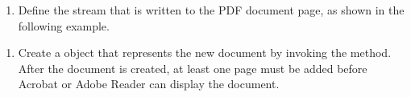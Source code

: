 \documentclass[letterpaper,12pt,english,openany,oneside]{sphinxmanual}
\begin{document}
\begin{sphinxVerbatim}[commandchars=\\\{\}]
 
     
     
     
     
\end{sphinxVerbatim}
\begin{enumerate}
%
\setcounter{enumi}{1}
\item {} 
Define the stream that is written to the PDF document page, as shown in the following example.

\end{enumerate}

\begin{sphinxVerbatim}[commandchars=\\\{\}]
   
     
\end{sphinxVerbatim}
\begin{enumerate}
%
\setcounter{enumi}{2}
\item {} 
Create a  object that represents the new document by invoking the  method. After the document is created, at least one page must be added before Acrobat or Adobe Reader can display the document.

\end{enumerate}
\end{document}
